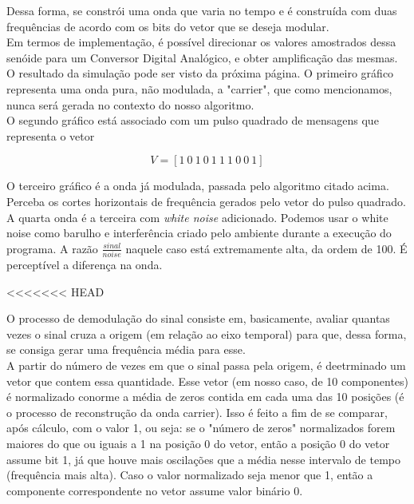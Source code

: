 \documentclass[11pt,a4paper]{report}
\begin{document}
	Dessa forma, se constrói uma onda que varia no tempo e é construída com duas frequências de acordo com os bits do vetor que se deseja modular.\\
	
	Em termos de implementação, é possível direcionar os valores amostrados dessa senóide para um Conversor Digital Analógico, e obter amplificação das mesmas.\\
	
	O resultado da simulação pode ser visto da próxima página. O primeiro gráfico representa uma onda pura, não modulada, a "carrier", que como mencionamos, nunca será gerada no contexto do nosso algoritmo.\\
	
	O segundo gráfico está associado com um pulso quadrado de mensagens que representa o vetor 
	
	\[V = [1\ 0\ 1\ 0\ 1\ 1\ 1\ 0\ 0\ 1]\]
	
	O terceiro gráfico é a onda já modulada, passada pelo algoritmo citado acima. Perceba os cortes horizontais de frequência gerados pelo vetor do pulso quadrado.\\
	
	A quarta onda é a terceira com {\it white noise} adicionado. Podemos usar o white noise como barulho e interferência criado pelo ambiente durante a execução do programa. A razão $\frac{sinal}{noise}$ naquele caso está extremamente alta, da ordem de 100. É perceptível a diferença na onda.
	
<<<<<<< HEAD
	
	
	O processo de demodulação do sinal consiste em, basicamente, avaliar quantas vezes o sinal cruza a origem (em relação ao eixo temporal) para que, dessa forma, se consiga gerar uma frequência média para esse.\\
	
	A partir do número de vezes em que o sinal passa pela origem, é deetrminado um vetor que contem essa quantidade. Esse vetor (em nosso caso, de 10 componentes) é normalizado conorme a média de zeros contida em cada uma das 10 posições (é o processo de reconstrução da onda carrier). Isso é feito a fim de se comparar, após cálculo, com o valor 1, ou seja: se o "número de zeros" normalizados forem maiores do que ou iguais a 1 na posição 0 do vetor, então a posição 0 do vetor assume bit 1, já que houve mais oscilações que a média nesse intervalo de tempo (frequência mais alta). Caso o valor normalizado seja menor que 1, então a componente correspondente no vetor assume valor binário 0.
	
\end{document}
